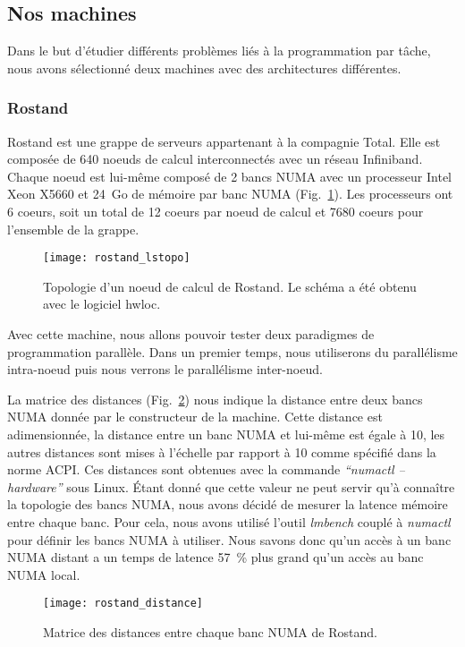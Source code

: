 \subsection{Nos machines}
Dans le but d'étudier différents problèmes liés à la programmation par tâche, nous avons sélectionné deux machines avec des architectures différentes.

\subsubsection{Rostand}
Rostand est une grappe de serveurs appartenant à la compagnie Total.
%
Elle est composée de 640 noeuds de calcul interconnectés avec un réseau Infiniband.
%
Chaque noeud est lui-même composé de 2 bancs NUMA avec un processeur Intel Xeon X5660 et 24~Go de mémoire par banc NUMA (Fig.~\ref{fig:rostand}).
%
Les processeurs ont 6 coeurs, soit un total de 12 coeurs par noeud de calcul et 7680 coeurs pour l'ensemble de la grappe.

\begin{figure}[!h]
        \centering
        \texttt{[image: rostand\_lstopo]}
        \caption{Topologie d'un noeud de calcul de Rostand. Le schéma a été obtenu avec le logiciel hwloc.}
        \label{fig:rostand}
\end{figure}
Avec cette machine, nous allons pouvoir tester deux paradigmes de programmation parallèle.
%
Dans un premier temps, nous utiliserons du parallélisme intra-noeud puis nous verrons le parallélisme inter-noeud.

La matrice des distances (Fig.~\ref{fig:rostand_distance}) nous indique la distance entre deux bancs NUMA donnée par le constructeur de la machine.
%
Cette distance est adimensionnée, la distance entre un banc NUMA et lui-même est égale à 10, les autres distances sont mises à l'échelle par rapport à 10 comme spécifié dans la norme ACPI.
%
Ces distances sont obtenues avec la commande {\em ``numactl --hardware''} sous Linux.
%
\'Etant donné que cette valeur ne peut servir qu'à connaître la topologie des bancs NUMA, nous avons décidé de mesurer la latence mémoire entre chaque banc.
%
Pour cela, nous avons utilisé l'outil {\em lmbench} couplé à {\em numactl} pour définir les bancs NUMA à utiliser.
%
Nous savons donc qu'un accès à un banc NUMA distant a un temps de latence 57~\% plus grand qu'un accès au banc NUMA local.

\begin{figure}[!h]
        \centering
        \texttt{[image: rostand\_distance]}
        \caption{Matrice des distances entre chaque banc NUMA de Rostand.}
        \label{fig:rostand_distance}
\end{figure}

